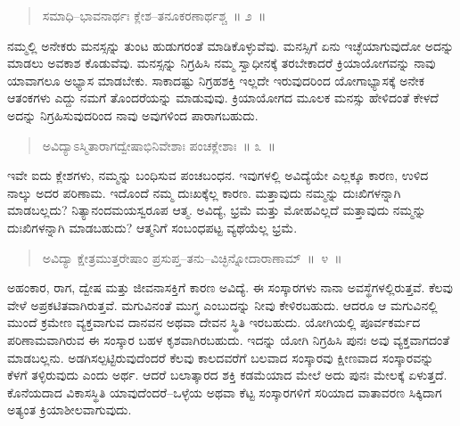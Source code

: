 \vspace{-0.15cm}

\begin{verse}
ಸಮಾಧಿ–ಭಾವನಾರ್ಥಃ ಕ್ಲೇಶ–ತನೂಕರಣಾರ್ಥಶ್ಚ~॥ ೨~॥
\end{verse}

\vspace{-0.4cm}


\vspace{0.15cm}

ನಮ್ಮಲ್ಲಿ ಅನೇಕರು ಮನಸ್ಸನ್ನು ತುಂಟ ಹುಡುಗರಂತೆ ಮಾಡಿಕೊಳ್ಳುವೆವು. ಮನಸ್ಸಿಗೆ ಏನು ಇಚ್ಛೆಯಾಗುವುದೋ ಅದನ್ನು ಮಾಡಲು ಅವಕಾಶ ಕೊಡುವೆವು. ಮನಸ್ಸನ್ನು ನಿಗ್ರಹಿಸಿ ನಮ್ಮ ಸ್ವಾಧೀನಕ್ಕೆ ತರಬೇಕಾದರೆ ಕ್ರಿಯಾಯೋಗವನ್ನು ನಾವು ಯಾವಾಗಲೂ ಅಭ್ಯಾಸ ಮಾಡಬೇಕು. ಸಾಕಾದಷ್ಟು ನಿಗ್ರಹಶಕ್ತಿ ಇಲ್ಲದೇ ಇರುವುದರಿಂದ ಯೋಗಾಭ್ಯಾಸಕ್ಕೆ ಅನೇಕ ಆತಂಕಗಳು ಎದ್ದು ನಮಗೆ ತೊಂದರೆಯನ್ನು ಮಾಡುವುವು. ಕ್ರಿಯಾಯೋಗದ ಮೂಲಕ ಮನಸ್ಸು ಹೇಳಿದಂತೆ ಕೇಳದೆ ಅದನ್ನು ನಿಗ್ರಹಿಸುವುದರಿಂದ ನಾವು ಅವುಗಳಿಂದ ಪಾರಾಗಬಹುದು. 

\vspace{-0.2cm}

\begin{verse}
ಅವಿದ್ಯಾಽಸ್ಮಿತಾರಾಗದ್ವೇಷಾಭಿನಿವೇಶಾಃ ಪಂಚಕ್ಲೇಶಾಃ~॥ ೩~॥
\end{verse}

\vspace{-0.4cm}


\vskip 0.2cm

ಇವೇ ಐದು ಕ್ಲೇಶಗಳು, ನಮ್ಮನ್ನು ಬಂಧಿಸುವ ಪಂಚಬಂಧನ. ಇವುಗಳಲ್ಲಿ ಅವಿದ್ಯೆಯೇ ಎಲ್ಲಕ್ಕೂ ಕಾರಣ, ಉಳಿದ ನಾಲ್ಕು ಅದರ ಪರಿಣಾಮ. ಇದೊಂದೆ ನಮ್ಮ ದುಃಖಕ್ಕೆಲ್ಲ ಕಾರಣ. ಮತ್ತಾವುದು ನಮ್ಮನ್ನು ದುಃಖಿಗಳನ್ನಾಗಿ ಮಾಡಬಲ್ಲದು? ನಿತ್ಯಾನಂದಮಯಸ್ವರೂಪ ಆತ್ಮ. ಅವಿದ್ಯೆ, ಭ್ರಮೆ ಮತ್ತು ಮೋಹವಿಲ್ಲದೆ ಮತ್ತಾವುದು ನಮ್ಮನ್ನು ದುಃಖಿಗಳನ್ನಾಗಿ ಮಾಡಬಹುದು? ಆತ್ಮನಿಗೆ ಸಂಬಂಧಪಟ್ಟ ವ್ಯಥೆಯೆಲ್ಲ ಭ್ರಮೆ. 

\vspace{-0.2cm}

\begin{verse}
ಅವಿದ್ಯಾ ಕ್ಷೇತ್ರಮುತ್ತರೇಷಾಂ ಪ್ರಸುಪ್ತ–ತನು–ವಿಚ್ಛಿನ್ನೋದಾರಾಣಾಮ್​~॥~೪~॥
\end{verse}

\vspace{-0.4cm}


\vskip 0.2cm

ಅಹಂಕಾರ, ರಾಗ, ದ್ವೇಷ ಮತ್ತು ಜೀವನಾಸಕ್ತಿಗೆ ಕಾರಣ ಅವಿದ್ಯೆ. ಈ ಸಂಸ್ಕಾರಗಳು ನಾನಾ ಅವಸ್ಥೆಗಳಲ್ಲಿರುತ್ತವೆ. ಕೆಲವು ವೇಳೆ ಅಪ್ರಕಟಿತವಾಗಿರುತ್ತವೆ. ಮಗುವಿನಂತೆ ಮುಗ್ಧ ಎಂಬುದನ್ನು ನೀವು ಕೇಳಿರಬಹುದು. ಆದರೂ ಆ ಮಗುವಿನಲ್ಲಿ ಮುಂದೆ ಕ್ರಮೇಣ ವ್ಯಕ್ತವಾಗುವ ದಾನವನ ಅಥವಾ ದೇವನ ಸ್ಥಿತಿ ಇರಬಹುದು. ಯೋಗಿಯಲ್ಲಿ ಪೂರ್ವಕರ್ಮದ ಪರಿಣಾಮವಾಗಿರುವ ಈ ಸಂಸ್ಕಾರ ಬಹಳ ಕೃಶವಾಗಿರಬಹುದು. ಇದನ್ನು ಯೋಗಿ ನಿಗ್ರಹಿಸಿ ಪುನಃ ಅವು ವ್ಯಕ್ತವಾಗದಂತೆ ಮಾಡಬಲ್ಲನು. ಅಡಗಿಸಲ್ಪಟ್ಟಿರುವುದೆಂದರೆ ಕೆಲವು ಕಾಲದವರೆಗೆ ಬಲವಾದ ಸಂಸ್ಕಾರವು ಕ್ಷೀಣವಾದ ಸಂಸ್ಕಾರವನ್ನು ಕೆಳಗೆ ತಳ್ಳಿರುವುದು ಎಂದು ಅರ್ಥ. ಆದರೆ ಬಲಾತ್ಕಾರದ ಶಕ್ತಿ ಕಡಮೆಯಾದ ಮೇಲೆ ಅದು ಪುನಃ ಮೇಲಕ್ಕೆ ಏಳುತ್ತದೆ. ಕೊನೆಯದಾದ ವಿಕಾಸಸ್ಥಿತಿ ಯಾವುದೆಂದರೆ–ಒಳ್ಳೆಯ ಅಥವಾ ಕೆಟ್ಟ ಸಂಸ್ಕಾರಗಳಿಗೆ ಸರಿಯಾದ ವಾತಾವರಣ ಸಿಕ್ಕಿದಾಗ ಅತ್ಯಂತ ಕ್ರಿಯಾಶೀಲವಾಗುವುದು. 

